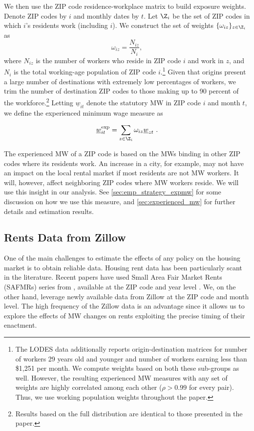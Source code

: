 We then use the ZIP code residence-workplace matrix to build exposure weights. Denote 
ZIP codes by $i$ and monthly dates by $t$. Let $\Z_i$ be the set of ZIP codes in 
which $i$'s residents work (including $i$). We construct the set of weights 
$\{\omega_{iz}\}_{z \in \Z_i}$ as $$\omega_{iz} = \frac{N_{iz}}{N_i} , $$ where 
$N_{iz}$ is the number of workers who reside in ZIP code $i$ and work in $z$, and $N_i$ 
is the total working-age population of ZIP code $i$.\footnote{The LODES data additionally 
	reports origin-destination matrices for number of workers 29 years old and younger  
	and number of workers earning less than \$1,251 per month. We compute weights based 
	on both these sub-groups as well. However, the resulting experienced MW measures with
	any set of weights are highly correlated among each other ($\rho>0.99$ for every pair).
	Thus, we use working population weights throughout the paper.} 
Given that origins present a large number of destinations with extremely low percentages of 
workers, we trim the number of destination ZIP codes to those making up to 90 percent of the 
workforce.\footnote{Results based on the full distribution are identical to those presented
	in the paper.} 
Letting $\underline{w}_{it}$ denote the statutory MW in ZIP code $i$ and month $t$, we 
define the experienced minimum wage measure as

\begin{equation}
\underline{w}^{\text{exp}}_{it} = 
\sum_{z \in \Z_i} \omega_{iz} \underline{w}_{zt} \ . 
\end{equation}

The experienced MW of a ZIP code is based on the MWs binding in other ZIP codes 
where its residents work. An increase in a city, for example, may not have an impact on 
the local rental market if most residents are not MW workers. It will, however, 
affect neighboring ZIP codes where MW workers reside. We will use this insight in our 
analysis. See \autoref{sec:emp_strategy_expmw} for some discussion on how we use this 
measure, and \autoref{sec:experienced_mw} for further details and estimation results.

\subsection{Rents Data from Zillow}

One of the main challenges to estimate the effects of any policy on the housing market
is to obtain reliable data. Housing rent data has been particularly scant in the 
literature. Recent papers have used Small Area Fair Market Rents (SAFMRs) series from 
\textcite{hud}, available at the ZIP code and year level \parencite{Tidemann2018, 
Yamagishi2019}. We, on the other hand, leverage newly available data from Zillow at the 
ZIP code and month level. The high frequency of the Zillow data is an advantage since it 
allows us to explore the effects of MW changes on rents exploiting the precise timing of 
their enactment.

